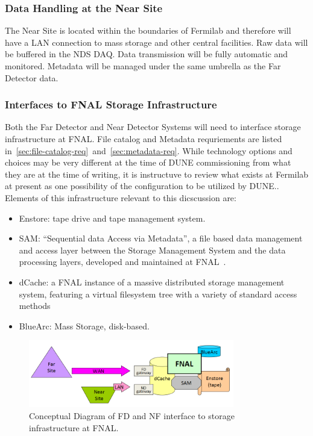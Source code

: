 \subsubsection{Data Handling at the Near Site}

The Near Site is located within the boundaries of Fermilab and therefore will have a LAN connection to mass storage
and other central facilities. Raw data will be buffered in the NDS DAQ. Data transmission will be fully automatic and monitored.
Metadata will be managed under the same umbrella as the Far Detector data.

\subsubsection{Interfaces to FNAL Storage Infrastructure}
Both the Far Detector and Near Detector Systems will need to interface storage infrastructure at FNAL.
File catalog and Metadata requriements are listed in~\ref{sec:file-catalog-req}~and~\ref{sec:metadata-req}.
While technology options and choices may be very different at the time of DUNE commissioning from what they
are at the time of writing, it is instructuve to review what exists at Fermilab at present as one possibility of the
configuration to be utilized by DUNE..
Elements of this infrastructure relevant to this dicscussion are:
\begin{itemize}
\item Enstore: tape drive and tape management system.

\item SAM: ``Sequential data Access via Metadata'', a file based data management and access layer between the Storage Management System
and the data processing layers, developed and maintained at FNAL~\cite{sam_chep12}.

\item dCache: a FNAL instance of a massive distributed storage management system, featuring a virtual filesystem tree with a variety of standard access methods
~\cite{dcache_chep12}

\item BlueArc: Mass Storage, disk-based.

\end{itemize}

\begin{figure}[h!]
\centering
\includegraphics[width=0.8\textwidth]{fnal-data-infrastructure-sketch-1.png}
\caption{Conceptual Diagram of FD and NF interface to storage infrastructure at FNAL.}
\label{fig:fnal-data-infrastructure}
\end{figure}

